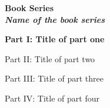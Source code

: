 
\vspace{1cm}
\thispagestyle{empty}


\parbox{0.9\textwidth}{
  \begin{center}
	\bfseries \sffamily \LARGE Book Series\\
    \textit{Name of the book series}
  \end{center}
}

\begin{center}

\vspace{1cm}    
\vspace{1cm}

\sffamily \textbf{Part I: Title of part one}

\sffamily Part II: Title of part two

\sffamily Part III: Title of part three

\sffamily Part IV: Title of part four

\end{center}



\newpage
